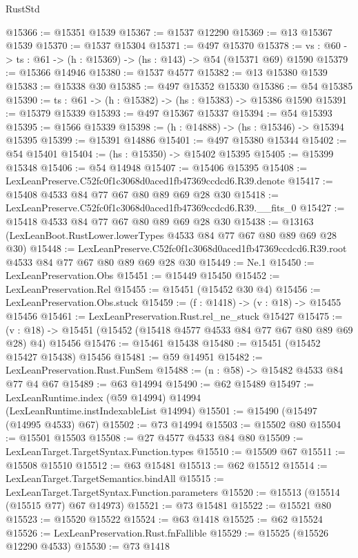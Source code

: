 \begin{lexlean}{RustStd}
\begin{coremodule}
@15366 := @15351 @1539
@15367 := @1537 @12290
@15369 := @13 @15367 @1539
@15370 := @1537 @15304
@15371 := @497 @15370
@15378 := {vs : @60} -> {ts : @61} -> (h : @15369) -> (hs : @143) -> @54 (@15371 @69) @1590
@15379 := @15366 @14946
@15380 := @1537 @4577
@15382 := @13 @15380 @1539
@15383 := @15338 @30
@15385 := @497 @15352 @15330
@15386 := @54 @15385
@15390 := {ts : @61} -> (h : @15382) -> (hs : @15383) -> @15386 @1590
@15391 := @15379 @15339
@15393 := @497 @15367 @15337
@15394 := @54 @15393
@15395 := @1566 @15339
@15398 := (h : @14888) -> (hs : @15346) -> @15394 @15395
@15399 := @15391 @14886
@15401 := @497 @15380 @15344
@15402 := @54 @15401
@15404 := (hs : @15350) -> @15402 @15395
@15405 := @15399 @15348
@15406 := @54 @14948
@15407 := @15406 @15395
@15408 := LexLeanPreserve.C52fc0f1c3068d0aced1fb47369ccdcd6.R39.denote
@15417 := @15408 @4533 @84 @77 @67 @80 @89 @69 @28 @30
@15418 := LexLeanPreserve.C52fc0f1c3068d0aced1fb47369ccdcd6.R39.__fits_0
@15427 := @15418 @4533 @84 @77 @67 @80 @89 @69 @28 @30
@15438 := @13163 (LexLeanBoot.RustLower.lowerTypes @4533 @84 @77 @67 @80 @89 @69 @28 @30)
@15448 := LexLeanPreserve.C52fc0f1c3068d0aced1fb47369ccdcd6.R39.root
    @4533
    @84
    @77
    @67
    @80
    @89
    @69
    @28
    @30
@15449 := Ne.{1}
@15450 := LexLeanPreservation.Obs
@15451 := @15449 @15450
@15452 := LexLeanPreservation.Rel
@15455 := @15451 (@15452 @30 @4)
@15456 := LexLeanPreservation.Obs.stuck
@15459 := (f : @1418) -> (v : @18) -> @15455 @15456
@15461 := LexLeanPreservation.Rust.rel_ne_stuck @15427
@15475 := (v : @18) -> @15451 (@15452 (@15418 @4577 @4533 @84 @77 @67 @80 @89 @69 @28) @4) @15456
@15476 := @15461 @15438
@15480 := @15451 (@15452 @15427 @15438) @15456
@15481 := @59 @14951
@15482 := LexLeanPreservation.Rust.FunSem
@15488 := (n : @58) -> @15482 @4533 @84 @77 @4 @67
@15489 := @63 @14994
@15490 := @62 @15489
@15497 := LexLeanRuntime.index (@59 @14994) @14994 (LexLeanRuntime.instIndexableList @14994)
@15501 := @15490 (@15497 (@14995 @4533) @67)
@15502 := @73 @14994
@15503 := @15502 @80
@15504 := @15501 @15503
@15508 := @27 @4577 @4533 @84 @80
@15509 := LexLeanTarget.TargetSyntax.Function.types
@15510 := @15509 @67
@15511 := @15508 @15510
@15512 := @63 @15481
@15513 := @62 @15512
@15514 := LexLeanTarget.TargetSemantics.bindAll
@15515 := LexLeanTarget.TargetSyntax.Function.parameters
@15520 := @15513 (@15514 (@15515 @77) @67 @14973)
@15521 := @73 @15481
@15522 := @15521 @80
@15523 := @15520 @15522
@15524 := @63 @1418
@15525 := @62 @15524
@15526 := LexLeanPreservation.Rust.fnFallible
@15529 := @15525 (@15526 @12290 @4533)
@15530 := @73 @1418

\end{coremodule}
\end{lexlean}
